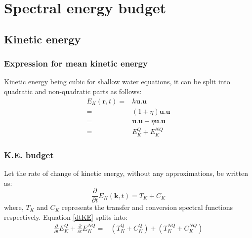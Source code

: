 \documentclass[a4paper,12pt]{paper}
\newcommand{\pder}[2][]{\frac{\partial#1}{\partial#2}}
\begin{document}
\section{Spectral energy budget}
\subsection{Kinetic energy}
\subsubsection{Expression for mean kinetic energy}
Kinetic energy being cubic for shallow water equations, it can be split into 
quadratic and non-quadratic parts as follows:
\begin{align*}
  E_K(\mathbf{r},t)
    =& h\mathbf{u}.\mathbf{u}\\
    =& (1+\eta)\mathbf{u}.\mathbf{u}\\
    =& \mathbf{u}.\mathbf{u} + \eta\mathbf{u}.\mathbf{u}\\
    =& E_K^Q + E_K^{NQ}
\end{align*}

\subsubsection{K.E. budget}
Let the rate of change of kinetic energy, without any approximations, be 
written as:
\begin{equation}\label{dtKE}
 \pder{t}E_K(\mathbf{k},t) = T_K + C_K
\end{equation}
where, $T_K$ and $C_K$ represents the transfer and conversion spectral 
functions respectively. Equation 
\eqref{dtKE} splits into:
\begin{align*}
 \pder{t}E_K^Q + \pder{t}E_K^{NQ}
 =&  (T_K^{Q} + C_K^{Q}) + (T_K^{NQ} + C_K^{NQ})
\end{align*}
\end{document}
